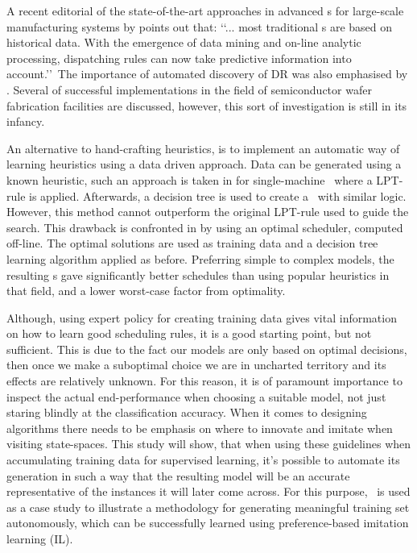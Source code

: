 \documentclass[smallextended]{svjour3}
\begin{document}
A recent editorial of the state-of-the-art approaches in advanced \dr s for 
large-scale manufacturing systems by \cite{Chen13} points out that:
\lq\lq ... most traditional \dr s are based on historical data. 
With the emergence of data mining and on-line analytic processing, dispatching 
rules can now take predictive information into account.\rq\rq~The importance of 
automated discovery of DR was also emphasised by \cite{Monch13}. 
Several of successful implementations in the field of semiconductor wafer 
fabrication facilities are discussed, however, this sort of investigation is 
still in its infancy.

An alternative to hand-crafting heuristics, is to implement an automatic way 
of learning heuristics using a data driven approach. 
Data can be generated using a known heuristic, such an approach is taken in 
\cite{Siggi05} for single-machine \jsp\ where a LPT-rule is applied.
Afterwards, a decision tree is used to create a \dr\ with similar logic. 
However, this method cannot outperform the original LPT-rule used to guide the 
search. 
This drawback is confronted in \cite{Malik08,Russell09,Siggi10} by using an 
optimal scheduler, computed off-line. 
The optimal solutions are used as training data and a decision tree 
learning algorithm applied as before. Preferring simple to complex models, the 
resulting \dr s gave significantly better schedules than using popular 
heuristics in that field, and a lower worst-case factor from optimality. 

Although, using expert policy for creating training data gives vital 
information on how to learn good scheduling rules, it is a good starting point, 
but not sufficient. This is due to the fact our models are only based on 
optimal decisions, then once we make a suboptimal choice we are in uncharted 
territory and its effects are relatively unknown. For this reason, it is of 
paramount importance to inspect the actual end-performance when choosing a 
suitable model, not just staring blindly at the classification accuracy. 
When it comes to designing algorithms there needs to be emphasis on where to 
innovate and imitate when visiting state-spaces. 
This study will show, that when using these guidelines when accumulating 
training data for supervised  learning, it's possible to automate its 
generation in such a way that the resulting model will be an accurate 
representative of the instances it will later come across. 
For this purpose, \JSP\ is used as a case study to illustrate a methodology for 
generating meaningful training set autonomously, which can be successfully 
learned using preference-based imitation learning (IL).
\end{document}
